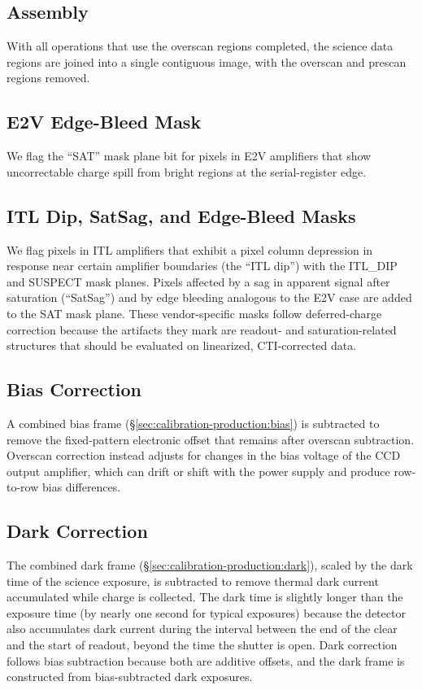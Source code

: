 \subsection{Assembly}
With all operations that use the overscan regions completed, the science data regions are joined into a single contiguous image, with the overscan and prescan regions removed.

\subsection{E2V Edge-Bleed Mask}
We flag the ``SAT'' mask plane bit for pixels in E2V amplifiers that show uncorrectable charge spill from bright regions at the serial-register edge.

\subsection{ITL Dip, SatSag, and Edge-Bleed Masks}
We flag pixels in ITL amplifiers that exhibit a pixel column depression in response near certain amplifier boundaries (the ``ITL dip'') with the ITL\_DIP and SUSPECT mask planes. Pixels affected by a sag in apparent signal after saturation (``SatSag'') and by edge bleeding analogous to the E2V case are added to the SAT mask plane.
These vendor-specific masks follow deferred-charge correction because the artifacts they mark are readout- and saturation-related structures that should be evaluated on linearized, CTI-corrected data.

\subsection{Bias Correction}
A combined bias frame (\S\ref{sec:calibration-production:bias}) is subtracted to remove the fixed-pattern electronic offset that remains after overscan subtraction.
Overscan correction instead adjusts for changes in the bias voltage of the CCD output amplifier, which can drift or shift with the power supply and produce row-to-row bias differences.

\subsection{Dark Correction}
The combined dark frame (\S\ref{sec:calibration-production:dark}), scaled by the dark time of the science exposure, is subtracted to remove thermal dark current accumulated while charge is collected.
The dark time is slightly longer than the exposure time (by nearly one second for typical exposures) because the detector also accumulates dark current during the interval between the end of the clear and the start of readout, beyond the time the shutter is open.
Dark correction follows bias subtraction because both are additive offsets, and the dark frame is constructed from bias-subtracted dark exposures.

